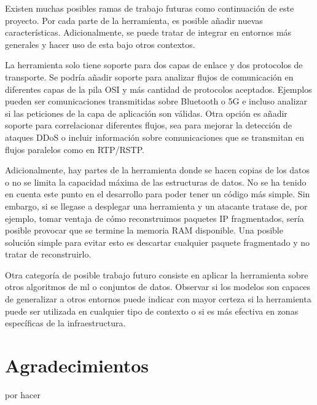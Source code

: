 Existen muchas posibles ramas de trabajo futuras como continuación de este proyecto. Por cada parte de la herramienta, es posible añadir nuevas características. Adicionalmente, se puede tratar de integrar en entornos más generales y hacer uso de esta bajo otros contextos.

La herramienta solo tiene soporte para dos capas de enlace y dos protocolos de transporte. Se podría añadir soporte para analizar flujos de comunicación en diferentes capas de la pila OSI y más cantidad de protocolos aceptados. Ejemplos pueden ser comunicaciones transmitidas sobre Bluetooth o 5G e incluso analizar si las peticiones de la capa de aplicación son válidas. Otra opción es añadir soporte para correlacionar diferentes flujos, sea para mejorar la detección de ataques DDoS o incluir información sobre comunicaciones que se transmitan en flujos paralelos como en RTP/RSTP.

Adicionalmente, hay partes de la herramienta donde se hacen copias de los datos o no se limita la capacidad máxima de las estructuras de datos. No se ha tenido en cuenta este punto en el desarrollo para poder tener un código más simple. Sin embargo, si se llegase a desplegar una herramienta y un atacante tratase de, por ejemplo, tomar ventaja de cómo reconstruimos paquetes IP fragmentados, sería posible provocar que se termine la memoria RAM disponible. Una posible solución simple para evitar esto es descartar cualquier paquete fragmentado y no tratar de reconstruirlo. 

Otra categoría de posible trabajo futuro consiste en aplicar la herramienta sobre otros algoritmos de \gls{ml} o conjuntos de datos. Observar si los modelos son capaces de generalizar a otros entornos puede indicar con mayor certeza si la herramienta puede ser utilizada en cualquier tipo de contexto o si es más efectiva en zonas específicas de la infraestructura.

\color{black}

\section{Agradecimientos}

por hacer

